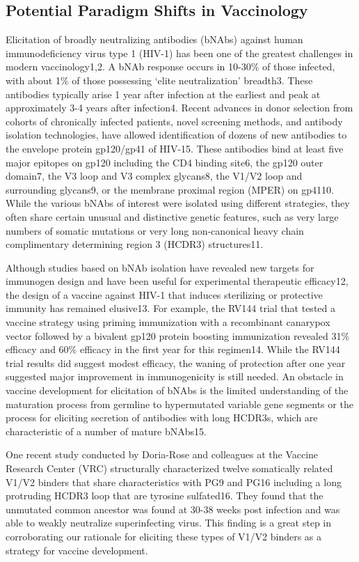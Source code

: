 \subsection{Potential Paradigm Shifts in Vaccinology}
Elicitation of broadly neutralizing antibodies (bNAbs) against human immunodeficiency virus type 1 (HIV-1) has been one of the greatest challenges in modern vaccinology1,2. A bNAb response occurs in 10-30\% of those infected, with about 1\% of those possessing ‘elite neutralization’ breadth3. These antibodies typically arise 1 year after infection at the earliest and peak at approximately 3-4 years after infection4. Recent advances in donor selection from cohorts of chronically infected patients, novel screening methods, and antibody isolation technologies, have allowed identification of dozens of new antibodies to the envelope protein gp120/gp41 of HIV-15. These antibodies bind at least five major epitopes on gp120 including the CD4 binding site6, the gp120 outer domain7,  the V3 loop and V3 complex glycans8, the V1/V2 loop and surrounding glycans9, or the membrane proximal region (MPER) on gp4110. While the various bNAbs of interest were isolated using different strategies, they often share certain unusual and distinctive genetic features, such as very large numbers of somatic mutations or very long non-canonical heavy chain complimentary determining region 3 (HCDR3) structures11.

Although studies based on bNAb isolation have revealed new targets for immunogen design and have been useful for experimental therapeutic efficacy12, the design of a vaccine against HIV-1 that induces sterilizing or protective immunity has remained elusive13. For example, the RV144 trial that tested a vaccine strategy using priming immunization with a recombinant canarypox vector followed by a bivalent gp120 protein boosting immunization revealed 31\% efficacy and 60\% efficacy in the first year for this regimen14. While the RV144 trial results did suggest modest efficacy, the waning of protection after one year suggested major improvement in immunogenicity is still needed. An obstacle in vaccine development for elicitation of bNAbs is the limited understanding of the maturation process from germline to hypermutated variable gene segments or the process for eliciting secretion of antibodies with long HCDR3s, which are characteristic of a number of mature bNAbs15.

One recent study conducted by Doria-Rose and colleagues at the Vaccine Research Center (VRC) structurally characterized twelve somatically related V1/V2 binders that share characteristics with PG9 and PG16 including a long protruding HCDR3 loop that are tyrosine sulfated16. They found that the unmutated common ancestor was found at 30-38 weeks post infection and was able to weakly neutralize superinfecting virus. This finding is a great step in corroborating our rationale for eliciting these types of V1/V2 binders as a strategy for vaccine development.

